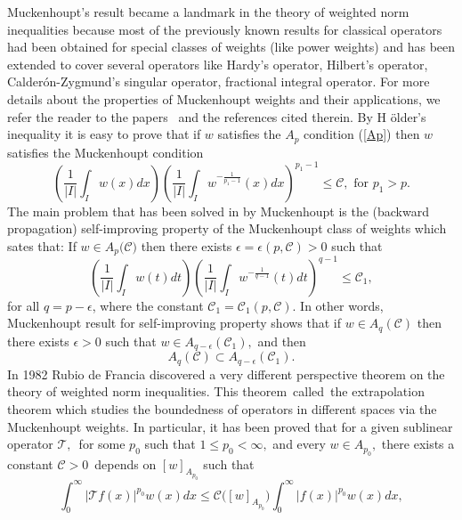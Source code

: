 \documentclass[a4paper]{amsart}
\theoremstyle{plain}
\numberwithin{equation}{section}
\begin{document}
Muckenhoupt's result became a landmark in the theory of weighted norm
inequalities because most of the previously known results for classical
operators had been obtained for special classes of weights (like power
weights) and has been extended to cover several operators like Hardy's
operator, Hilbert's operator, Calder\'{o}n-Zygmund's singular operator,
fractional integral operator. For more details about the properties of
Muckenhoupt weights and their applications, we refer the reader to the
papers\ \cite{car, Neu, Acta, Bull} and the references cited therein. By H%
\"{o}lder's inequality it is easy to prove that if $w$ satisfies the $A_{p}$
condition (\ref{Ap}) then $w$ satisfies the Muckenhoupt condition 
\begin{equation}
\left( \frac{1}{\left\vert I\right\vert }\int_{I}w(x)dx\right) \left( \frac{1%
}{\left\vert I\right\vert }\int_{I}w^{-\frac{1}{p_{1}-1}}(x)dx\right)
^{p_{1}-1}\leq \mathcal{C},\text{ for }p_{1}>p.
\end{equation}%
The main problem that has been solved in \cite{M} by Muckenhoupt is the
(backward propagation) self-improving property of the Muckenhoupt class of
weights which sates that: If $w\in A_{p}(\mathcal{C)}$ then there exists $%
\epsilon =\epsilon (p,\mathcal{C})>0$ such that%
\begin{equation}
\left( \frac{1}{\left\vert I\right\vert }\int_{I}w(t)dt\right) \left( \frac{1%
}{\left\vert I\right\vert }\int_{I}w^{-\frac{1}{q-1}}(t)dt\right) ^{q-1}\leq 
\mathcal{C}_{1},  \label{Api}
\end{equation}%
for all $q=p-\epsilon $, where the constant $\mathcal{C}_{1}=\mathcal{C}%
_{1}(p,\mathcal{C}).$ In other words, Muckenhoupt result for self-improving
property shows that if $w\in A_{q}(\mathcal{C})$ then there exists $\epsilon
>0$ such that $w\in A_{q-\epsilon }(\mathcal{C}_{1}),$ and then%
\begin{equation}
A_{q}(\mathcal{C})\subset A_{q-\epsilon }(\mathcal{C}_{1}).  \label{AP1}
\end{equation}%
In 1982 Rubio de Francia \cite{193} discovered a very different perspective
theorem on the theory of weighted norm inequalities. This theorem\ called\
the extrapolation theorem which studies the boundedness of operators in
different spaces via the Muckenhoupt weights. In particular, it has been
proved that for a given sublinear operator $\mathcal{T},$\ for some $p_{0}$
such that $1\leq p_{0}<\infty ,$ and every $w\in A_{p_{0}},$ there exists a
constant $\mathcal{C}>0$\ depends on $[w]_{A_{p_{0}}}$ such that%
\begin{equation*}
\int_{0}^{\infty }\left\vert \mathcal{T}f(x)\right\vert ^{p_{0}}w(x)dx\leq 
\mathcal{C(}[w]_{A_{p_{0}}})\int_{0}^{\infty }\left\vert f(x)\right\vert
^{p_{0}}w(x)dx,
\end{equation*}%
\end{document}
